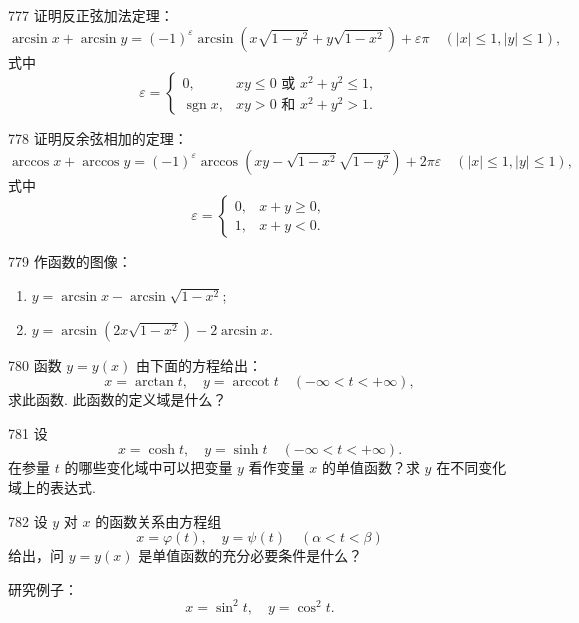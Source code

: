 \begin{prob}[M]{777}
证明反正弦加法定理：
\[
\arcsin x + \arcsin y = (-1)^{\varepsilon} \arcsin \left( x\sqrt{1 - y^2} + y\sqrt{1 - x^2} \right) + \varepsilon \pi \quad (|x| \leqslant 1, |y| \leqslant 1),
\]
式中
\[
\varepsilon = \begin{cases}
0, & xy \leqslant 0 \text{ 或 } x^2 + y^2 \leqslant 1, \\
\operatorname{sgn} x, & xy > 0 \text{ 和 } x^2 + y^2 > 1.
\end{cases}
\]
\end{prob}

\begin{prob}[M]{778}
证明反余弦相加的定理：
\[
\arccos x + \arccos y = (-1)^{\varepsilon} \arccos \left( xy - \sqrt{1 - x^2}\sqrt{1 - y^2} \right) + 2\pi \varepsilon \quad (|x| \leqslant 1, |y| \leqslant 1),
\]
式中
\[
\varepsilon = \begin{cases}
0, & x + y \geqslant 0, \\
1, & x + y < 0.
\end{cases}
\]
\end{prob}

\begin{prob}[M]{779}
作函数的图像：
\begin{enumerate}[label=(\alph*), itemsep=2pt, topsep=3pt]
    \item $y = \arcsin x - \arcsin \sqrt{1 - x^2}$;
    \item $y = \arcsin \left(2x\sqrt{1 - x^2}\right) - 2\arcsin x.$
\end{enumerate}
\end{prob}

\begin{prob}[M]{780}
函数 $y = y(x)$ 由下面的方程给出：
\[
x = \arctan t, \quad y = \operatorname{arccot} t \quad (-\infty < t < +\infty),
\]
求此函数. 此函数的定义域是什么？
\end{prob}

\begin{prob}[M]{781}
设
\[
x = \cosh t, \quad y = \sinh t \quad (-\infty < t < +\infty).
\]
在参量 $t$ 的哪些变化域中可以把变量 $y$ 看作变量 $x$ 的单值函数？求 $y$ 在不同变化域上的表达式.
\end{prob}

\begin{prob}[M]{782}
设 $y$ 对 $x$ 的函数关系由方程组
\[
x = \varphi(t), \quad y = \psi(t) \quad (\alpha < t < \beta)
\]
给出，问 $y = y(x)$ 是单值函数的充分必要条件是什么？

研究例子：
\[
x = \sin^2 t, \quad y = \cos^2 t.
\]
\end{prob}

